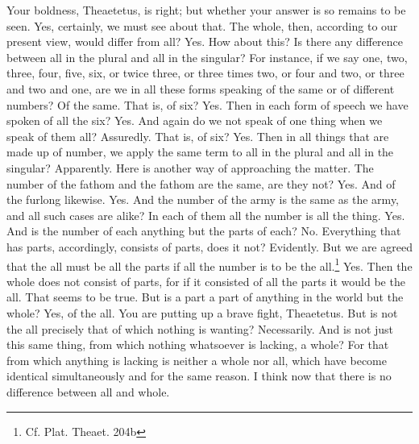 \documentclass[letterpaper,12pt]{article}
\newcommand{\stephpag}[1]{\marginnote{\small\itshape\fontfamily{ppl}\selectfont #1}}
\begin{document}
\begin{drama}
Your boldness, Theaetetus, is right; but whether your answer is so remains to be seen.
\theaetetusspeaks
Yes, certainly, we must see about that.
\socratesspeaks
The whole, then, according to our present view, would differ from all?
\theaetetusspeaks
Yes.
\socratesspeaks
How about this? Is there any difference between all in the plural and all in the singular? For instance, if we say one, two, three, \stephpag{c} four, five, six, or twice three, or three times two, or four and two, or three and two and one, are we in all these forms speaking of the same or of different numbers?
\theaetetusspeaks
Of the same.
\socratesspeaks
That is, of six?
\theaetetusspeaks
Yes.
\socratesspeaks
Then in each form of speech we have spoken of all the six?
\theaetetusspeaks
Yes.
\socratesspeaks
And again do we not speak of one thing when we speak of them all?
\theaetetusspeaks
Assuredly.
\socratesspeaks
That is, of six?
\theaetetusspeaks
Yes. \stephpag{d}
\socratesspeaks
Then in all things that are made up of number, we apply the same term to all in the plural and all in the singular?
\theaetetusspeaks
Apparently.
\socratesspeaks
Here is another way of approaching the matter. The number of the fathom and the fathom are the same, are they not?
\theaetetusspeaks
Yes.
\socratesspeaks
And of the furlong likewise.
\theaetetusspeaks
Yes.
\socratesspeaks
And the number of the army is the same as the army, and all such cases are alike? In each of them all the number is all the thing.
\theaetetusspeaks
Yes.
\socratesspeaks
And is the number of each anything but \stephpag{e} the parts of each?
\theaetetusspeaks
No.
\socratesspeaks
Everything that has parts, accordingly, consists of parts, does it not?
\theaetetusspeaks
Evidently.
\socratesspeaks
But we are agreed that the all must be all the parts if all the number is to be the all.\footnote{Cf. Plat. Theaet. 204b}
\theaetetusspeaks
Yes.
\socratesspeaks
Then the whole does not consist of parts, for if it consisted of all the parts it would be the all.
\theaetetusspeaks
That seems to be true.
\socratesspeaks
But is a part a part of anything in the world but the whole?
\theaetetusspeaks
Yes, of the all. \stephpag{205 a}
\socratesspeaks
You are putting up a brave fight, Theaetetus. But is not the all precisely that of which nothing is wanting?
\theaetetusspeaks
Necessarily.
\socratesspeaks
And is not just this same thing, from which nothing whatsoever is lacking, a whole? For that from which anything is lacking is neither a whole nor all, which have become identical simultaneously and for the same reason.
\theaetetusspeaks
I think now that there is no difference between all and whole.

\end{drama}
\end{document}
